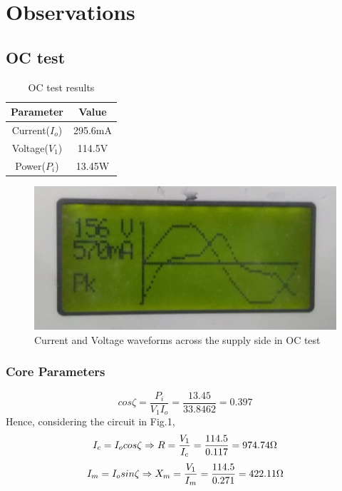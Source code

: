 \documentclass[12pt]{article}
\begin{document}
  \newpage
    \section{Observations}
        
        \subsection{OC test}
            
            \begin{table}[H]
                \centering
                \begin{tabular}{|c|c|}
                    \hline
                    Parameter & Value\\
                    \hline
                    Current($I_o$) & 295.6mA \\
                    Voltage($V_1$) & 114.5V \\
                    Power($P_i$) & 13.45W\\
                    \hline
                \end{tabular}
                \caption{OC test results}
                \label{tab:my_label}
            \end{table}
            
            \begin{figure}[H]
                \centering
                \includegraphics[width = 0.6\linewidth]{LAB-2/OC_test_waveforms1.jpeg}
                \caption{Current and Voltage waveforms across the supply side in OC test}
            \end{figure}
            
            \subsubsection{Core Parameters}
      
                $$cos\zeta=\dfrac{P_i}{V_1I_o}=\dfrac{13.45}{33.8462}=0.397$$
                Hence, considering the circuit in Fig.1,$$I_c=I_ocos\zeta\\
                \Rightarrow R=\dfrac{V_1}{I_c}=\dfrac{114.5}{0.117}=974.74\Omega$$ $$I_m=I_osin\zeta\\
                \Rightarrow X_m=\dfrac{V_1}{I_m}=\dfrac{114.5}{0.271}=422.11\Omega$$
            
\end{document}
